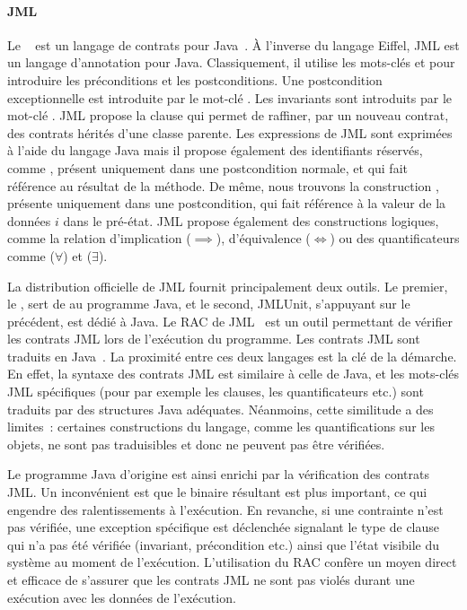 \paragraph{JML} Le ~ est un langage
de contrats pour Java~. À l'inverse du langage Eiffel, JML est un
langage d'annotation pour Java. Classiquement, il utilise les mots-clés
 et  pour introduire les préconditions et les
postconditions. Une postcondition exceptionnelle est introduite par le mot-clé
. Les invariants sont introduits par le mot-clé .
JML propose la clause  qui permet de raffiner, par un nouveau
contrat, des contrats hérités d'une classe parente. Les expressions de JML sont
exprimées à l'aide du langage Java mais il propose également des identifiants
réservés, comme \aresult, présent uniquement dans une postcondition normale, et
qui fait référence au résultat de la méthode. De même, nous trouvons la
construction , présente uniquement dans une postcondition, qui fait
référence à la valeur de la données $i$ dans le pré-état. JML propose également
des constructions logiques, comme la relation d'implication ($\implies$),
d'équivalence ($\Longleftrightarrow$) ou des quantificateurs comme
 ($\forall$) et  ($\exists$).

La distribution officielle de JML fournit principalement deux outils.  Le
premier, le , sert de
 au programme Java, et le second, JMLUnit, s'appuyant sur
le précédent, est dédié à Java. Le RAC de JML~ est un outil
permettant de vérifier les contrats JML lors de l'exécution du programme. Les
contrats JML sont traduits en Java~. La proximité entre ces
deux langages est la clé de la démarche. En effet, la syntaxe des contrats JML
est similaire à celle de Java, et les mots-clés JML spécifiques (pour par
exemple les clauses, les quantificateurs etc.) sont traduits par des structures
Java adéquates. Néanmoins, cette similitude a des limites~: certaines
constructions du langage, comme les quantifications sur les objets, ne sont pas
traduisibles et donc ne peuvent pas être vérifiées.

Le programme Java d'origine est ainsi enrichi par la vérification des contrats
JML. Un inconvénient est que le binaire résultant est plus important, ce qui
engendre des ralentissements à l'exécution. En revanche, si une contrainte n'est
pas vérifiée, une exception spécifique est déclenchée signalant le type de
clause qui n'a pas été vérifiée (invariant, précondition etc.) ainsi que l'état
visibile du système au moment de l'exécution. L'utilisation du RAC confère un
moyen direct et efficace de s'assurer que les contrats JML ne sont pas violés
durant une exécution avec les données de l'exécution.

